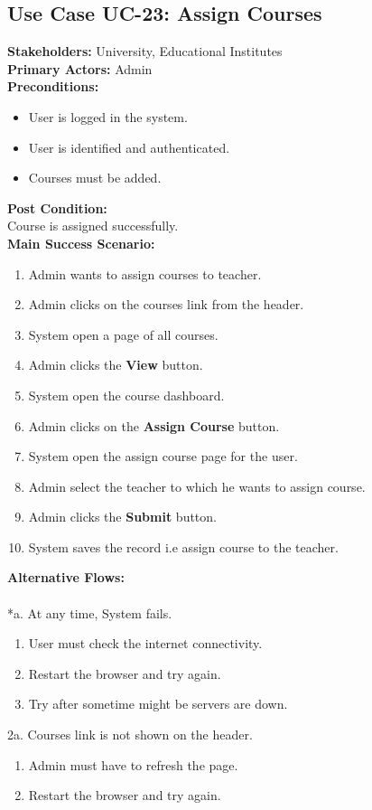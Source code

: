 \subsection{Use Case UC-23: Assign Courses}
\textbf{Stakeholders: } University, Educational Institutes \\
\textbf{Primary Actors: }Admin\\
\textbf{Preconditions:}
\begin{itemize}
\item User is logged in the system.
\item User is identified and authenticated.
\item Courses must be added.
\end{itemize}
\textbf{Post Condition: }\\
Course is assigned successfully.\\
\textbf{Main Success Scenario:}
\begin{enumerate}
\item Admin wants to assign courses to teacher.
\item Admin clicks on the courses link from the header.
\item System open a page of all courses.
\item Admin clicks the \textbf{View} button.
\item System open the course dashboard.
\item Admin clicks on the \textbf{Assign Course} button.
\item System open the assign course page for the user.
\item Admin select the teacher to which he wants to assign course.
\item Admin clicks the \textbf{Submit} button.
\item System saves the record i.e assign course to the teacher.
\end{enumerate}
\textbf{Alternative Flows:}\\
\\
*a. At any time, System fails.
\begin{enumerate}
\item User must check the internet connectivity.
\item Restart the browser and try again.
\item Try after sometime might be servers are down.
\end{enumerate}
2a. Courses link is not shown on the header.
\begin{enumerate}
\item Admin must have to refresh the page.
\item Restart the browser and try again.
\end{enumerate} 
